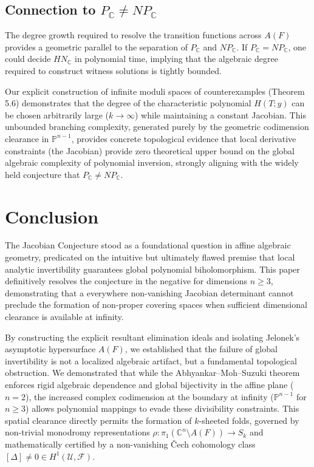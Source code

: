 \documentclass[11pt,reqno]{amsart}
\theoremstyle{definition}
\begin{document}
\subsection{Connection to $P_{\mathbb{C}} \neq NP_{\mathbb{C}}$}
The degree growth required to resolve the transition functions across $A(F)$ provides a geometric parallel to the separation of $P_{\mathbb{C}}$ and $NP_{\mathbb{C}}$. If $P_{\mathbb{C}} = NP_{\mathbb{C}}$, one could decide $HN_{\mathbb{C}}$ in polynomial time, implying that the algebraic degree required to construct witness solutions is tightly bounded. 

Our explicit construction of infinite moduli spaces of counterexamples (Theorem 5.6) demonstrates that the degree of the characteristic polynomial $H(T; y)$ can be chosen arbitrarily large ($k \to \infty$) while maintaining a constant Jacobian. This unbounded branching complexity, generated purely by the geometric codimension clearance in $\mathbb{P}^{n-1}$, provides concrete topological evidence that local derivative constraints (the Jacobian) provide zero theoretical upper bound on the global algebraic complexity of polynomial inversion, strongly aligning with the widely held conjecture that $P_{\mathbb{C}} \neq NP_{\mathbb{C}}$.


\section{Conclusion}

The Jacobian Conjecture stood as a foundational question in affine algebraic geometry, predicated on the intuitive but ultimately flawed premise that local analytic invertibility guarantees global polynomial biholomorphism. This paper definitively resolves the conjecture in the negative for dimensions $n \ge 3$, demonstrating that a everywhere non-vanishing Jacobian determinant cannot preclude the formation of non-proper covering spaces when sufficient dimensional clearance is available at infinity.

By constructing the explicit resultant elimination ideals and isolating Jelonek's asymptotic hypersurface $A(F)$, we established that the failure of global invertibility is not a localized algebraic artifact, but a fundamental topological obstruction. We demonstrated that while the Abhyankar--Moh--Suzuki theorem enforces rigid algebraic dependence and global bijectivity in the affine plane ($n=2$), the increased complex codimension at the boundary at infinity ($\mathbb{P}^{n-1}$ for $n \ge 3$) allows polynomial mappings to evade these divisibility constraints. This spatial clearance directly permits the formation of $k$-sheeted folds, governed by non-trivial monodromy representations $\rho: \pi_1(\mathbb{C}^n \setminus A(F)) \to S_k$ and mathematically certified by a non-vanishing \v{C}ech cohomology class $[\Delta] \neq 0 \in H^1(\mathcal{U}, \mathcal{F})$.
\end{document}
